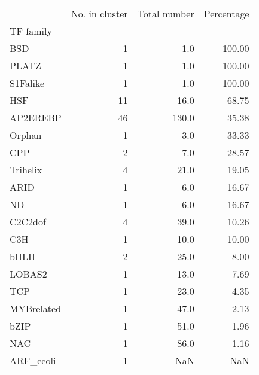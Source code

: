 \begin{tabular}{lrrr}
\toprule
{} &  No. in cluster &  Total number &  Percentage \\
TF family  &                 &               &             \\
\midrule
BSD        &               1 &           1.0 &      100.00 \\
PLATZ      &               1 &           1.0 &      100.00 \\
S1Falike   &               1 &           1.0 &      100.00 \\
HSF        &              11 &          16.0 &       68.75 \\
AP2EREBP   &              46 &         130.0 &       35.38 \\
Orphan     &               1 &           3.0 &       33.33 \\
CPP        &               2 &           7.0 &       28.57 \\
Trihelix   &               4 &          21.0 &       19.05 \\
ARID       &               1 &           6.0 &       16.67 \\
ND         &               1 &           6.0 &       16.67 \\
C2C2dof    &               4 &          39.0 &       10.26 \\
C3H        &               1 &          10.0 &       10.00 \\
bHLH       &               2 &          25.0 &        8.00 \\
LOBAS2     &               1 &          13.0 &        7.69 \\
TCP        &               1 &          23.0 &        4.35 \\
MYBrelated &               1 &          47.0 &        2.13 \\
bZIP       &               1 &          51.0 &        1.96 \\
NAC        &               1 &          86.0 &        1.16 \\
ARF\_ecoli  &               1 &           NaN &         NaN \\
\bottomrule
\end{tabular}
